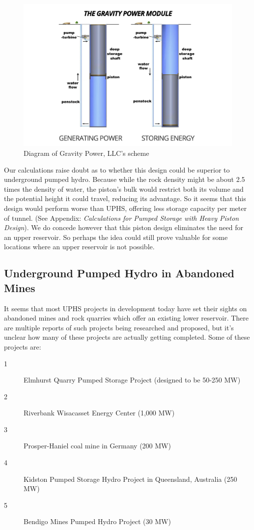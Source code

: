 \documentclass[hidelinks,12pt,a4paper]{article}
\begin{document}
\begin{figure}[ht!]
    \centering
    \includegraphics[width=1\textwidth]{gravity-power-diagram.png}
    \caption{Diagram of Gravity Power, LLC's scheme \cite{GravityPowerTechnologyPage}}
\end{figure}
\FloatBarrier

Our calculations raise doubt as to whether this design could be superior to underground pumped hydro. Because while the rock density might be about 2.5 times the density of water, the piston's bulk would restrict both its volume and the potential height it could travel, reducing its advantage. So it seems that this design would perform worse than UPHS, offering less storage capacity per meter of tunnel. (See Appendix: \textit{Calculations for Pumped Storage with Heavy Piston Design}). We do concede however that this piston design eliminates the need for an upper reservoir. So perhaps the idea could still prove valuable for some locations where an upper reservoir is not possible.


\subsection{Underground Pumped Hydro in Abandoned Mines}
It seems that most UPHS projects in development today have set their sights on abandoned mines and rock quarries which offer an existing lower reservoir. There are multiple reports of such projects being researched and proposed, but it's unclear how many of these projects are actually getting completed. Some of these projects are:\cite{SubSurfacePumpedHydroelectricStorage, GermanCoalMineMayBePrimeForPumpedStorage, 250MWKidstonPumpedStorageHydroProject, BendigoMinesPumpedHydroProject}
{\footnotesize
\begin{description}
    \item[1] Elmhurst Quarry Pumped Storage Project (designed to be 50-250 MW)
    \item[2] Riverbank Wisacasset Energy Center (1,000 MW)
    \item[3] Prosper-Haniel coal mine in Germany (200 MW)
    \item[4] Kidston Pumped Storage Hydro Project in Queensland, Australia (250 MW)
    \item[5] Bendigo Mines Pumped Hydro Project (30 MW)
\end{description}
}
\end{document}
